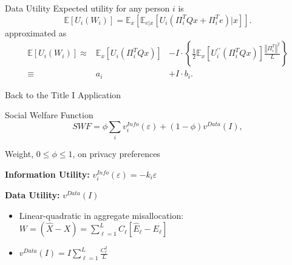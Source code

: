 \begin{frame}{Data Utility}
 Expected utility for any person $i$ is
$$
  \mathbb{E}\left[U_{i}(W_{i})\right] = \mathbb{E}_{x}\left[\mathbb{E}_{e|x}\left[U_{i}\left(\Pi_{i}^{T}Qx + \Pi_{i}^{T}e\right)\vert x\right] \right].
$$
approximated as
 \begin{equation}
  \begin{array}{rcl}
   \mathbb{E}\left[U_{i}(W_{i})\right]  \approx &  \mathbb{E}_{x}\left[U_{i}(\Pi_{i}^{T}Qx)\right] &- I\cdot \left\{\frac{1}{2}\mathbb{E}_{x}\left[U_{i}^{\prime\prime}(\Pi_{i}^{T}Qx)\right] \frac{\left\Vert \Pi_{i}^{T} \right\Vert^{2}}{L}\right\} \\
   \equiv & a_{i} & + I\cdot b_{i}.
   \end{array}
 \end{equation}
 \end{frame}
  
\begin{transitionframe}
  \begin{center}
    \Huge Back to the Title I Application
  \end{center}
\end{transitionframe}

\begin{frame}{Social Welfare Function}
\begin{equation*}
  SWF = \phi\sum_{i}v_{i}^{Info}(\varepsilon) + (1-\phi)v^{Data}(I),
\end{equation*}
  \begin{wideitemize}
    \item Weight, $0\le\phi\le1$, on privacy preferences
    \item \textbf{Information Utility:} $v_{i}^{Info}(\varepsilon) = -k_{i}\varepsilon$ %
    \item \textbf{Data Utility:} $v^{Data}(I)$
      \begin{itemize}
        \item Linear-quadratic in aggregate misallocation: $W=(\widehat{X}-X) = \sum_{\ell=1}^{L}C_{\ell}\left[\widehat{E}_{\ell}-E_{\ell}\right]$
        \item $v^{Data}(I)=I\sum_{\ell=1}^{L}\frac{C_{\ell}^{2}}{L}$
      \end{itemize}
  \end{wideitemize}
\end{frame}


